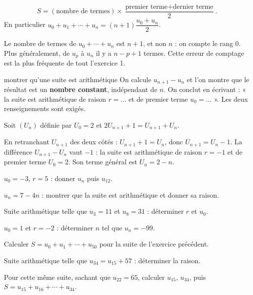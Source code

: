 \begin{theoreme}
\[
  S = \left(\text{nombre de termes}\right)
      \times \frac{\text{premier terme}+\text{dernier terme}}{2} .
\]
En particulier $u_{0}+u_{1}+\cdots+u_{n} = (n+1)\dfrac{u_{0}+u_{n}}{2}$.
\end{theoreme}

\begin{avertissement}
Le nombre de termes de $u_{0}+\cdots+u_{n}$ est $n+1$, et non $n$ : on
compte le rang $0$. Plus généralement, de $u_{p}$ à $u_{n}$ il y a
$n-p+1$ termes. Cette erreur de comptage est la plus fréquente de tout
l'exercice 1.
\end{avertissement}

\begin{methode}{montrer qu'une suite est arithmétique}
On calcule $u_{n+1}-u_{n}$ et l'on montre que le résultat est un
\textbf{nombre constant}, indépendant de $n$. On conclut en écrivant : « la
suite est arithmétique de raison $r = \dots$ et de premier terme
$u_{0} = \dots$ ». Les deux renseignements sont exigés.
\end{methode}

\begin{exemple}
Soit $\left(U_{n}\right)$ définie par $U_{0} = 2$ et
$2U_{n+1}+1 = U_{n+1}+U_{n}$.

En retranchant $U_{n+1}$ des deux côtés : $U_{n+1}+1 = U_{n}$, donc
$U_{n+1} = U_{n}-1$. La différence $U_{n+1}-U_{n}$ vaut $-1$ : la suite est
arithmétique de raison $r = -1$ et de premier terme $U_{0} = 2$. Son terme
général est $U_{n} = 2-n$.
\end{exemple}

\begin{entrainement}
\exo[\niveau{1}] $u_{0} = -3$, $r = 5$ : donner $u_{n}$ puis $u_{12}$.

\exo[\niveau{1}] $u_{n} = 7-4n$ : montrer que la suite est arithmétique et
donner sa raison.

\exo[\niveau{2}] Suite arithmétique telle que $u_{3} = 11$ et $u_{8} = 31$ :
déterminer $r$ et $u_{0}$.

\exo[\niveau{2}] $u_{0} = 1$ et $r = -2$ : déterminer $n$ tel que
$u_{n} = -99$.

\exo[\niveau{2}] Calculer $S = u_{0}+u_{1}+\cdots+u_{50}$ pour la suite de
l'exercice précédent.

\exo[\niveau{3}] Suite arithmétique telle que $u_{34} = u_{15}+57$ :
déterminer la raison.

\exo[\niveau{3}] Pour cette même suite, sachant que $u_{22} = 65$, calculer
$u_{15}$, $u_{34}$, puis $S = u_{15}+u_{16}+\cdots+u_{34}$.
\end{entrainement}

